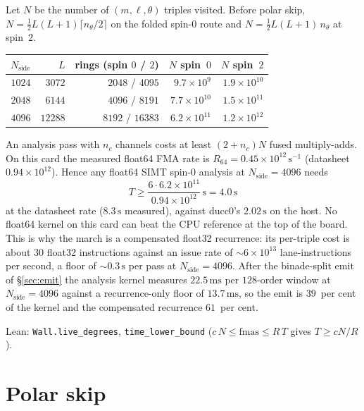 \documentclass[11pt,a4paper]{article}
\numberwithin{equation}{section}
\begin{document}
Let $N$ be the number of $(m,\ell,\theta)$ triples visited.  Before polar
skip, $N=\tfrac12 L(L+1)\lceil n_\theta/2\rceil$ on the folded spin-$0$
route and $N=\tfrac12 L(L+1)\,n_\theta$ at spin~$2$.

\begin{center}
\small
\begin{tabular}{@{}rrrrr@{}}
\toprule
$N_{\mathrm{side}}$ & $L$ & rings (spin $0$ / $2$) & $N$ spin~$0$ & $N$ spin~$2$ \\
\midrule
$1024$ & $3072$  & $2048$ / $4095$  & $9.7\times 10^{9}$  & $1.9\times 10^{10}$ \\
$2048$ & $6144$  & $4096$ / $8191$  & $7.7\times 10^{10}$ & $1.5\times 10^{11}$ \\
$4096$ & $12288$ & $8192$ / $16383$ & $6.2\times 10^{11}$ & $1.2\times 10^{12}$ \\
\bottomrule
\end{tabular}
\end{center}

An analysis pass with $n_c$ channels costs at least $(2+n_c)N$ fused
multiply-adds.  On this card the measured float64 FMA rate is
$R_{64}=0.45\times 10^{12}\,\mathrm{s}^{-1}$ (datasheet
$0.94\times 10^{12}$).  Hence any float64 SIMT spin-$0$ analysis at
$N_{\mathrm{side}}=4096$ needs
\begin{equation}
\label{eq:T}
T\ge\frac{6\cdot 6.2\times 10^{11}}{0.94\times 10^{12}}\,\mathrm{s}
   =4.0\,\mathrm{s}
\end{equation}
at the datasheet rate ($8.3\,\mathrm{s}$ measured), against ducc0's
$2.02\,\mathrm{s}$ on the host.  No float64 kernel on this card can beat
the CPU reference at the top of the board.  This is why the march is a
compensated float32 recurrence: its per-triple cost is about $30$ float32
instructions against an issue rate of $\sim 6\times 10^{13}$
lane-instructions per second, a floor of $\sim 0.3\,\mathrm{s}$ per pass at
$N_{\mathrm{side}}=4096$.  After the binade-split emit of \S\ref{sec:emit}
the analysis kernel measures $22.5\,\mathrm{ms}$ per $128$-order window at
$N_{\mathrm{side}}=4096$ against a recurrence-only floor of $13.7\,\mathrm{ms}$,
so the emit is $39$~per cent of the kernel and the compensated recurrence
$61$~per cent.

Lean: \texttt{Wall.live\_degrees}, \texttt{time\_lower\_bound}
($c\,N\le\mathrm{fmas}\le R\,T$ gives $T\ge cN/R$).

\section{Polar skip}
\label{sec:polar}
\end{document}
